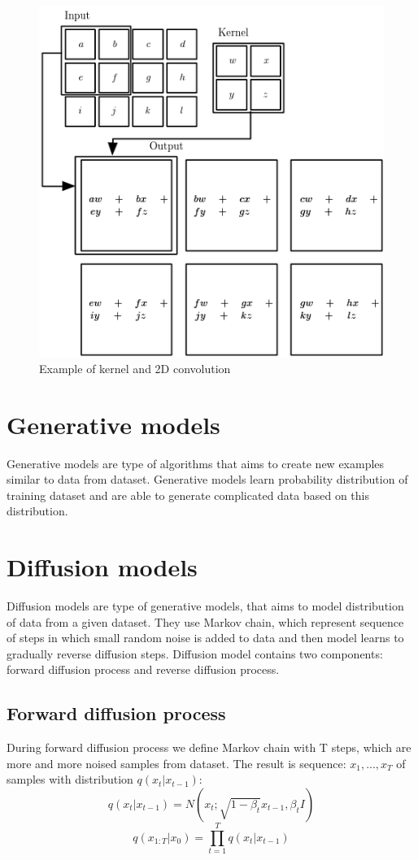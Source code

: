 \documentclass[11pt,a4paper]{report}
\begin{document}
\begin{figure}[H]
	\centering
	\includegraphics[scale=0.6]{images/convolution}
    \caption{Example of kernel and 2D convolution \cite{convolution}}
\end{figure} 

\section{Generative models}
Generative models are type of algorithms that aims to create new examples similar to data from dataset. Generative models learn probability distribution of training dataset and are able to generate complicated data based on this distribution.
\section{Diffusion models}
Diffusion models are type of generative models, that aims to model distribution of data from a given dataset. They use Markov chain, which represent sequence of steps in which small random noise is added to data and then model learns to gradually reverse diffusion steps. Diffusion model contains two components: forward diffusion process and reverse diffusion process.

\subsection{Forward diffusion process}
During forward diffusion process we define Markov chain with T steps, which are more and more noised samples from dataset. The result is sequence: $x_1,..., x_T$  of samples with distribution $q(x_t|x_{t-1})$:
\[ q(x_t|x_{t-1}) = N(x_t;\sqrt{1-\beta_t}x_{t-1}, \beta_tI) \]
\[ q(x_{1:T}|x_0) = \prod_{t=1}^{T}{q(x_t|x_{t-1})} \]
\end{document}
